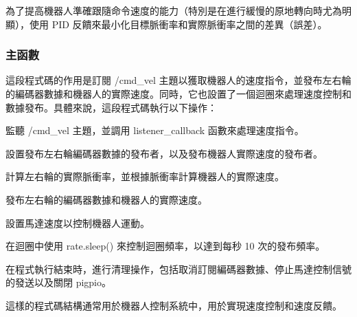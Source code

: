 為了提高機器人準確跟隨命令速度的能力（特別是在進行緩慢的原地轉向時尤為明顯），使用 PID 反饋來最小化目標脈衝率和實際脈衝率之間的差異（誤差）。

\subsubsection{主函數}

這段程式碼的作用是訂閱 /cmd\_vel 主題以獲取機器人的速度指令，並發布左右輪的編碼器數據和機器人的實際速度。同時，它也設置了一個迴圈來處理速度控制和數據發布。具體來說，這段程式碼執行以下操作：

監聽 /cmd\_vel 主題，並調用 listener\_callback 函數來處理速度指令。

設置發布左右輪編碼器數據的發布者，以及發布機器人實際速度的發布者。

計算左右輪的實際脈衝率，並根據脈衝率計算機器人的實際速度。

發布左右輪的編碼器數據和機器人的實際速度。

設置馬達速度以控制機器人運動。

在迴圈中使用 rate.sleep() 來控制迴圈頻率，以達到每秒 10 次的發布頻率。

在程式執行結束時，進行清理操作，包括取消訂閱編碼器數據、停止馬達控制信號的發送以及關閉 pigpio。

這樣的程式碼結構通常用於機器人控制系統中，用於實現速度控制和速度反饋。





